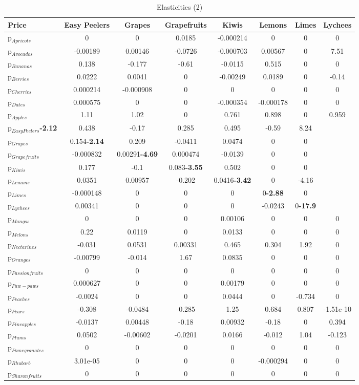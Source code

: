 \documentclass[11pt]{article}
\begin{document}
\begin{table}[h]
\caption{Elasticities (2)}
\label{table:elasticities 2}
\begin{center}
\begin{tabular}{lccccccc} \hline \hline
Price &Easy Peelers &Grapes &Grapefruits &Kiwis &Lemons &Limes &Lychees \\ \hline
p$_{Apricots}$ &0 &0 &0.0185 &-0.000214 &0 &0 &0 \\
p$_{Avocados}$ &-0.00189 &0.00146 &-0.0726 &-0.000703 &0.00567 &0 &7.51 \\
p$_{Bananas}$ &0.138 &-0.177 &-0.61 &-0.0115 &0.515 &0 &0 \\
p$_{Berries}$ &0.0222 &0.0041 &0 &-0.00249 &0.0189 &0 &-0.14 \\
p$_{Cherries}$ &0.000214 &-0.000908 &0 &0 &0 &0 &0 \\
p$_{Dates}$ &0.000575 &0 &0 &-0.000354 &-0.000178 &0 &0 \\
p$_{Apples}$ &1.11 &1.02 &0 &0.761 &0.898 &0 &0.959 \\
p$_{Easy Peelers}$\textbf{-2.12} &0.438 &-0.17 &0.285 &0.495 &-0.59 &8.24 \\
p$_{Grapes}$ &0.154\textbf{-2.14} &0.209 &-0.0411 &0.0474 &0 &0 \\
p$_{Grapefruits}$ &-0.000832 &0.00291\textbf{-4.69} &0.000474 &-0.0139 &0 &0 \\
p$_{Kiwis}$ &0.177 &-0.1 &0.083\textbf{-3.55} &0.502 &0 &0 \\
p$_{Lemons}$ &0.0351 &0.00957 &-0.202 &0.0416\textbf{-3.42} &0 &-4.16 \\
p$_{Limes}$ &-0.000148 &0 &0 &0 &0\textbf{-2.88} &0 \\
p$_{Lychees}$ &0.00341 &0 &0 &0 &-0.0243 &0\textbf{-17.9} \\
p$_{Mangos}$ &0 &0 &0 &0.00106 &0 &0 &0 \\
p$_{Melons}$ &0.22 &0.0119 &0 &0.0133 &0 &0 &0 \\
p$_{Nectarines}$ &-0.031 &0.0531 &0.00331 &0.465 &0.304 &1.92 &0 \\
p$_{Oranges}$ &-0.00799 &-0.014 &1.67 &0.0835 &0 &0 &0 \\
p$_{Passion fruits}$ &0 &0 &0 &0 &0 &0 &0 \\
p$_{Paw-paws}$ &0.000627 &0 &0 &0.00179 &0 &0 &0 \\
p$_{Peaches}$ &-0.0024 &0 &0 &0.0444 &0 &-0.734 &0 \\
p$_{Pears}$ &-0.308 &-0.0484 &-0.285 &1.25 &0.684 &0.807 &-1.51e-10 \\
p$_{Pineapples}$ &-0.0137 &0.00448 &-0.18 &0.00932 &-0.18 &0 &0.394 \\
p$_{Plums}$ &0.0502 &-0.00602 &-0.0201 &0.0166 &-0.012 &1.04 &-0.123 \\
p$_{Pomegranates}$ &0 &0 &0 &0 &0 &0 &0 \\
p$_{Rhubarb}$ &3.01e-05 &0 &0 &0 &-0.000294 &0 &0 \\
p$_{Sharon fruits}$ &0 &0 &0 &0 &0 &0 &0 \\
\end{tabular}
\end{center}
\end{table}
\end{document}
